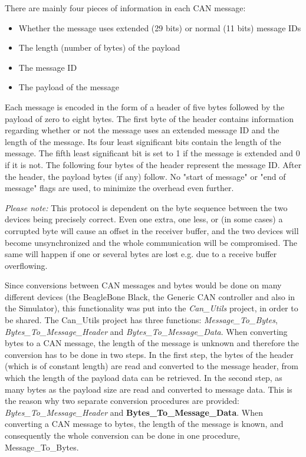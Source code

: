 There are mainly four pieces of information in each CAN message: 
\begin{itemize}
   \item { Whether the message uses extended (29 bits) or normal (11 bits) message IDs} 
   \item { The length (number of bytes) of the payload} 
   \item { The message ID}
   \item { The payload of the message}
\end{itemize}

Each message is encoded in the form of a header of five bytes followed by the payload of zero to eight bytes. The first byte of the header contains information regarding whether or not the message uses an extended message ID and the length of the message. Its four least significant bits contain the length of the message. The fifth least significant bit is set to 1 if the message is extended and 0 if it is not.  \newline
The following four bytes of the header represent the message ID. \newline
After the header, the payload bytes (if any) follow. \newline
No "start of message" or "end of message" flags are used, to minimize the overhead even further.

\emph{Please note:} This protocol is dependent on the byte sequence between the two devices being precisely correct. Even one extra, one less, or (in some cases) a corrupted byte will cause an offset in the receiver buffer, and the two devices will become unsynchronized and the whole communication will be compromised. The same will happen if one or several bytes are lost e.g. due to a receive buffer overflowing. \newline

Since conversions between CAN messages and bytes would be done on many different devices (the BeagleBone Black, the Generic CAN controller and also in the Simulator), this functionality was put into the \emph{Can\_Utils} project, in order to be shared. \newline
The Can\_Utils project has three functions: \emph{Message\_To\_Bytes}, \emph{Bytes\_To\_Message\_Header} and \emph{Bytes\_To\_Message\_Data}.  \newline
When converting bytes to a CAN message, the length of the message is unknown and therefore the conversion has to be done in two steps. 
In the first step, the bytes of the header (which is of constant length) are read and converted to the message header, from which the length of the payload data can be retrieved. In the second step, as many bytes as the payload size are read and converted to message data. \newline
This is the reason why two separate conversion procedures are provided: \emph{Bytes\_To\_Message\_Header} and \newline \textbf{Bytes\_To\_Message\_Data}.  \newline
When converting a CAN message to bytes, the length of the message is known, and consequently the whole conversion can be done in one procedure, Message\_To\_Bytes.

